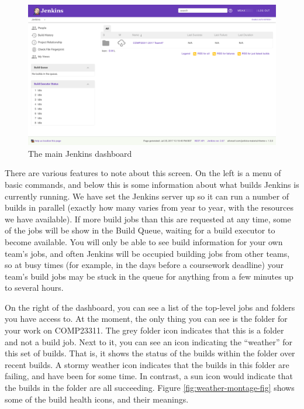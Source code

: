 \documentclass[
]{book}
\begin{document}
\begin{figure}

{\centering \includegraphics[width=1\linewidth]{images/dashboard} 

}

\caption{The main Jenkins dashboard}\label{fig:dashboard-fig}
\end{figure}

There are various features to note about this screen. On the left is a menu of basic commands, and below this is some information about what builds Jenkins is currently running. We have set the Jenkins server up so it can run a number of builds in parallel (exactly how many varies from year to year, with the resources we have available). If more build jobs than this are requested at any time, some of the jobs will be show in the Build Queue, waiting for a build executor to become available. You will only be able to see build information for your own team's jobs, and often Jenkins will be occupied building jobs from other teams, so at busy times (for example, in the days before a coursework deadline) your team's build jobs may be stuck in the queue for anything from a few minutes up to several hours.

On the right of the dashboard, you can see a list of the top-level jobs and folders you have access to. At the moment, the only thing you can see is the folder for your work on COMP23311. The grey folder icon indicates that this is a folder and not a build job. Next to it, you can see an icon indicating the ``weather'' for this set of builds. That is, it shows the status of the builds within the folder over recent builds. A stormy weather icon indicates that the builds in this folder are failing, and have been for some time. In contrast, a sun icon would indicate that the builds in the folder are all succeeding. Figure \ref{fig:weather-montage-fig} shows some of the build health icons, and their meanings.
\end{document}
